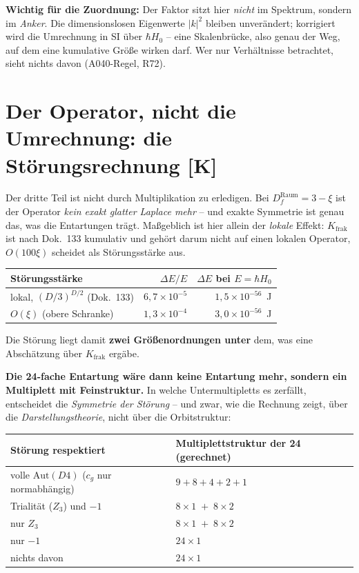 \documentclass[11pt]{report}
\begin{document}
\textbf{Wichtig für die Zuordnung:} Der Faktor sitzt hier
\emph{nicht} im Spektrum, sondern im \emph{Anker}. Die
dimensionslosen Eigenwerte $|k|^2$ bleiben unverändert; korrigiert
wird die Umrechnung in SI über $\hbar H_0$ -- eine
Skalenbrücke, also genau der Weg, auf dem eine kumulative Größe
wirken darf. Wer nur Verhältnisse betrachtet, sieht nichts davon
(A040-Regel, R72).

\section{Der Operator, nicht die Umrechnung: die Störungsrechnung [K]}

Der dritte Teil ist nicht durch Multiplikation zu erledigen. Bei
$D_f^\text{Raum} = 3-\xi$ ist der Operator \emph{kein exakt glatter
Laplace mehr} -- und exakte Symmetrie ist genau das, was die
Entartungen trägt. Maßgeblich ist hier allein der \emph{lokale}
Effekt: $K_\text{frak}$ ist nach Dok.~133 kumulativ und gehört
darum nicht auf einen lokalen Operator, $O(100\xi)$ scheidet als
Störungsstärke aus.

\begin{center}
\begin{tabular}{lrr}
\toprule
Störungsstärke & $\Delta E/E$ & $\Delta E$ bei $E = \hbar H_0$ \\
\midrule
lokal, $(D/3)^{D/2}$ (Dok.~133) & $6{,}7\times10^{-5}$ &
  $1{,}5\times10^{-56}$~J \\
$O(\xi)$ (obere Schranke) & $1{,}3\times10^{-4}$ &
  $3{,}0\times10^{-56}$~J \\
\bottomrule
\end{tabular}
\end{center}

\noindent Die Störung liegt damit \textbf{zwei Größenordnungen
unter} dem, was eine Abschätzung über $K_\text{frak}$ ergäbe.

\noindent \textbf{Die 24-fache Entartung wäre dann keine Entartung
mehr, sondern ein Multiplett mit Feinstruktur.} In welche
Untermultipletts es zerfällt, entscheidet die \emph{Symmetrie der
Störung} -- und zwar, wie die Rechnung zeigt, über die
\emph{Darstellungstheorie}, nicht über die Orbitstruktur:

\begin{center}
\begin{tabular}{ll}
\toprule
Störung respektiert & Multiplettstruktur der 24 (gerechnet) \\
\midrule
volle $\text{Aut}(D4)$ ($c_g$ nur normabhängig) &
  $9 + 8 + 4 + 2 + 1$ \\
Trialität ($Z_3$) und $-1$ & $8\times1 \;+\; 8\times2$ \\
nur $Z_3$ & $8\times1 \;+\; 8\times2$ \\
nur $-1$ & $24\times1$ \\
nichts davon & $24\times1$ \\
\bottomrule
\end{tabular}
\end{center}
\end{document}
